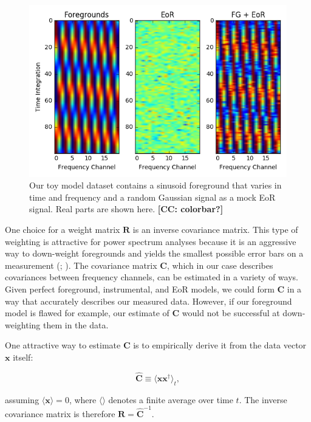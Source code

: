\documentclass[preprint2,numberedappendix,tighten]{aastex6}  %
\newcommand{\cc}[1]{{\color{purple} \textbf{[CC: #1]}}}
\begin{document}
\begin{figure}
	\centering
	\includegraphics[trim={0.3cm 0.2cm 0.3cm 0.3cm},clip,width=\columnwidth]{plots/toy_sigloss1.png}
	\caption{Our toy model dataset contains a sinusoid foreground that varies in time and frequency and a random Gaussian signal as a mock EoR signal. Real parts are shown here. \cc{colorbar?}}
	\label{fig:toy_sigloss1}
\end{figure}

One choice for a weight matrix $\textbf{R}$ is an inverse covariance matrix. This type of weighting is attractive for power spectrum analyses because it is an aggressive way to down-weight foregrounds and yields the smallest possible error bars on a measurement (\citealt{tegmark_et_al1997a}; \citealt{bond_et_al1998}). The covariance matrix $\textbf{C}$, which in our case describes covariances between frequency channels, can be estimated in a variety of ways. Given perfect foreground, instrumental, and EoR models, we could form $\textbf{C}$ in a way that accurately describes our measured data. However, if our foreground model is flawed for example, our estimate of $\textbf{C}$ would not be successful at down-weighting them in the data.

One attractive way to estimate $\textbf{C}$ is to empirically derive it from the data vector $\textbf{x}$ itself:

\begin{equation}
\hat{\textbf{C}} \equiv \langle\textbf{xx}^{\dagger}\rangle_{t},
\end{equation}

\noindent assuming $\langle\textbf{x}\rangle = 0$, where $\langle \rangle$ denotes a finite average over time $t$. The inverse covariance matrix is therefore $\textbf{R} = \hat{\textbf{C}}^{-1}$. 
\end{document}
